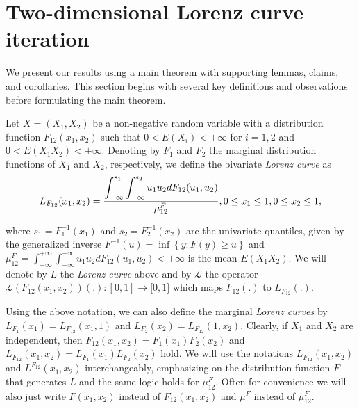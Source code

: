\documentclass[onecolumn]{article}
\providecommand{\dint}{\displaystyle\int}
\newtheorem{definition}[theorem]{Definition}
\let\olddefinition\definition
\let\endolddefinition\enddefinition
\renewenvironment{definition}{\olddefinition\normalfont}{\endolddefinition}
\renewcommand{\dint}{\displaystyle\int}
\begin{document}
\section{\protect\Large Two-dimensional Lorenz curve iteration }

We present our results using a main theorem with supporting lemmas, claims,
and corollaries. This section begins with several key definitions and
observations before formulating the main theorem.

\begin{definition}
\label{main-def} Let $X=(X_{1},X_{2})$ be a non-negative random variable
with a distribution function $F_{12}(x_{1},x_{2})$ such that $%
0<E(X_{i})<+\infty $ for $i=1,2$ and $0<E(X_{1}X_{2})<+\infty $. Denoting by 
$F_{1}$ and $F_{2}$ the marginal distribution functions of $X_{1}$ and $%
X_{2} $, respectively, we define the bivariate \textit{Lorenz curve} as 
\begin{equation}
L_{F_{12}}(x_{1},x_{2})=\frac{\dint\nolimits_{-\infty
}^{s_{1}}\dint\nolimits_{-\infty }^{s_{2}}u_{1}u_{2}dF_{12}(u_{1},u_{2})}{%
\mu _{12}^{F}},0\leq x_{1}\leq 1,0\leq x_{2}\leq 1,  \label{1}
\end{equation}

where $s_{1}=F_{1}^{-1}(x_{1})$ and $s_{2}=F_{2}^{-1}(x_{2})$ are the
univariate quantiles, given by the generalized inverse $F^{-1}(u)=\inf
\left\{ y:F(y)\geq u\right\} $ and $\mu _{12}^{F}=\int_{-\infty }^{+\infty
}\int_{-\infty }^{+\infty }u_{1}u_{2}dF_{12}(u_{1},u_{2})<+\infty $ is the
mean $E(X_{1}X_{2})$. We will denote by $L$ the \textit{Lorenz curve} above
and by $\mathcal{L}$ the operator $\mathcal{L}(F_{12}(x_{1},x_{2}))(.):[0,1]%
\longrightarrow \lbrack 0,1]$ which maps $F_{12}(.)$ to $L_{F_{12}}(.)$.
\end{definition}

Using the above notation, we can also define the marginal \textit{Lorenz
curves} by $L_{F_{1}}(x_{1})=L_{F_{12}}(x_{1},1)$ and $%
L_{F_{2}}(x_{2})=L_{F_{12}}(1,x_{2})$. Clearly, if $X_{1}$ and $X_{2}$ are
independent, then $F_{12}(x_{1},x_{2})=F_{1}(x_{1})F_{2}(x_{2})$ and $%
L_{F_{12}}(x_{1},x_{2})=L_{F_{1}}(x_{1})L_{F_{2}}(x_{2})$ hold. We will use
the notations $L_{F_{12}}(x_{1},x_{2})$ and $L^{F_{12}}(x_{1},x_{2})$
interchangeably, emphasizing on the distribution function $F$ that generates 
$L$ and the same logic holds for $\mu _{12}^{F}$. Often for convenience we
will also just write $F(x_{1},x_{2})$ instead of $F_{12}(x_{1},x_{2})$ and $%
\mu ^{F}$ instead of $\mu _{12}^{F}.$
\end{document}
